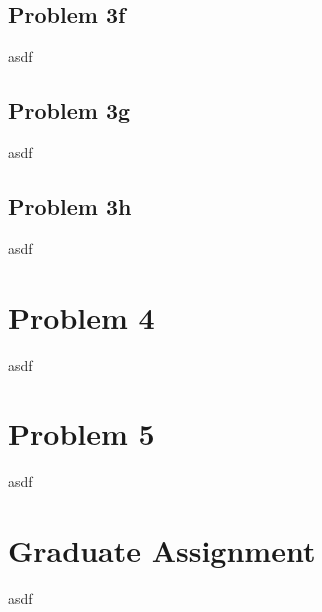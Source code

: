 \documentclass{article}
\begin{document}
\subsection{Problem 3f}
asdf

\subsection{Problem 3g}
asdf

\subsection{Problem 3h}
asdf



\section{Problem 4}
asdf


\section{Problem 5}
asdf


\section{Graduate Assignment}
asdf
\end{document}
